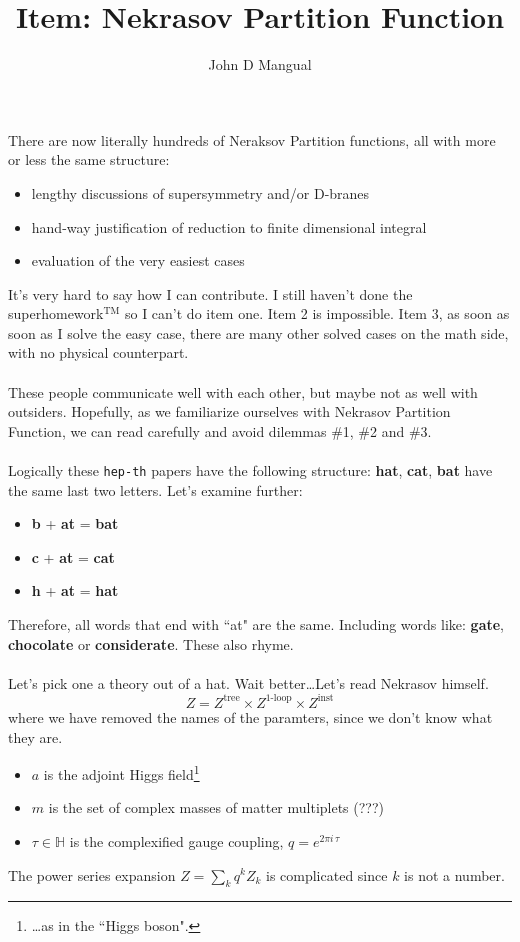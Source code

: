 \documentclass[12pt]{article}
\title{\textbf{Item: Nekrasov Partition Function}}
\author{John D Mangual}
\date{}
\begin{document}
\selectfont \fontsize{12.5}{15}\selectfont

\maketitle

\noindent There are now literally hundreds of Neraksov Partition functions, all with more or less the same structure:
\begin{itemize}
\item lengthy discussions of supersymmetry and/or D-branes
\item hand-way justification of reduction to finite dimensional integral
\item evaluation of the very easiest cases
\end{itemize}
It's very hard to say how I can contribute.  I still haven't done the superhomework${}^{\text{TM}}$ so I can't do item one.  Item 2 is impossible.  Item 3, as soon as soon as I solve the easy case, there are many other solved cases on the math side, with no physical counterpart.  \\ \\
These people communicate well with each other, but maybe not as well with outsiders.  Hopefully, as we familiarize ourselves with Nekrasov Partition Function, we can read carefully and avoid dilemmas \#1, \#2 and \#3. \\ \\
Logically these \texttt{hep-th} papers have the following structure: \textbf{hat}, \textbf{cat}, \textbf{bat} have the same last two letters.  Let's examine further: 
\begin{itemize}
\item \textbf{b} + \textbf{at} = \textbf{bat}
\item \textbf{c} + \textbf{at} = \textbf{cat}
\item \textbf{h} + \textbf{at} = \textbf{hat}
\end{itemize}
Therefore, all words that end with ``at" are the same.   Including words like: \textbf{gate}, \textbf{chocolate} or \textbf{considerate}.  These also rhyme.\\ \\
Let's pick one a theory out of a hat.  Wait better\dots Let's read Nekrasov himself. 
$$ Z = Z^\text{tree} \times Z^\text{1-loop} \times Z^\text{inst} $$
where we have removed the names of the paramters, since we don't know what they are.
\begin{itemize}
\item $a$ is the adjoint Higgs field\footnote{\dots as in the ``Higgs boson".}
\item $m$ is the set of complex masses of matter multiplets (???)
\item $\tau \in \mathbb{H}$ is the complexified gauge coupling, $q = e^{2\pi i \, \tau}$
\end{itemize}
The power series expansion $\displaystyle Z = \sum_k q^k Z_k $ is complicated since $k$ is not a number.
\end{document}
